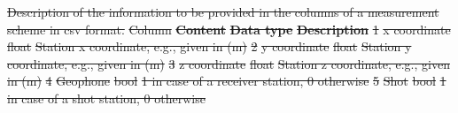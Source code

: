 \documentclass[a4paper,fleqn]{cas-sc}
\providecommand{\DIFdel}[1]{{\protect\color{red}\sout{#1}}}                      %
\providecommand{\DIFdelbegin}{} %
\providecommand{\DIFdelFL}[1]{\DIFdel{#1}} %
\newcommand{\DIFscaledelfig}{0.5}
\newlength{\DIFdelgraphicswidth} %
\newlength{\DIFdelgraphicsheight} %
\newcommand{\DIFdelincludegraphics}[2][]{%
\sbox{\DIFdelgraphicsbox}{\DIFOincludegraphics[#1]{#2}}%
\settoboxwidth{\DIFdelgraphicswidth}{\DIFdelgraphicsbox} %
\settoboxtotalheight{\DIFdelgraphicsheight}{\DIFdelgraphicsbox} %
\scalebox{\DIFscaledelfig}{%
\parbox[b]{\DIFdelgraphicswidth}{\usebox{\DIFdelgraphicsbox}\\[-\baselineskip] \rule{\DIFdelgraphicswidth}{0em}}\llap{\resizebox{\DIFdelgraphicswidth}{\DIFdelgraphicsheight}{%
\setlength{\unitlength}{\DIFdelgraphicswidth}%
\begin{picture}(1,1)%
\thicklines\linethickness{2pt} %
{\color[rgb]{1,0,0}\put(0,0){\framebox(1,1){}}}%
{\color[rgb]{1,0,0}\put(0,0){\line( 1,1){1}}}%
{\color[rgb]{1,0,0}\put(0,1){\line(1,-1){1}}}%
\end{picture}%
}\hspace*{3pt}}} %
} %
\DeclareRobustCommand{\DIFdelbegin}{\DIFOdelbegin \let\includegraphics\DIFdelincludegraphics} %
\begin{document}
\DIFdelbegin %
{%
\DIFdelFL{Description of the information to be provided in the columns of a measurement scheme in csv format.}}
\DIFdelFL{Column }%
\textbf{\DIFdelFL{Content}} %
\textbf{\DIFdelFL{Data type}} %
\textbf{\DIFdelFL{Description}} %
\DIFdelFL{1 }%
\DIFdelFL{x coordinate }%
\DIFdelFL{float }%
\DIFdelFL{Station x coordinate, e.g., given in (m) }%
\DIFdelFL{2 }%
\DIFdelFL{y coordinate }%
\DIFdelFL{float }%
\DIFdelFL{Station y coordinate, e.g., given in (m) }%
\DIFdelFL{3 }%
\DIFdelFL{z coordinate }%
\DIFdelFL{float }%
\DIFdelFL{Station z coordinate, e.g., given in (m) }%
\DIFdelFL{4 }%
\DIFdelFL{Geophone }%
\DIFdelFL{bool }%
\DIFdelFL{1 in case of a receiver station, 0 otherwise }%
\DIFdelFL{5 }%
\DIFdelFL{Shot }%
\DIFdelFL{bool }%
\DIFdelFL{1 in case of a shot station, 0 otherwise }%
\end{document}
